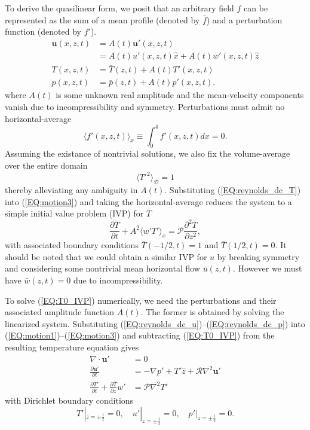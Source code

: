 \documentclass[reprint,amsmath,amssymb,aps]{revtex4-1}
\begin{document}
To derive the quasilinear form, we posit that an arbitrary field $f$ can be represented as the sum of a mean profile (denoted by $\bar{f}$) and a perturbation function (denoted by $f'$).
\begin{align}
    \mathbf{u}(x, z, t) &= A(t) \mathbf{u'}(x, z, t) \label{EQ:reynolds_dc_u}\\
    &= A(t) u'(x, z, t)\hat{x} + A(t) w'(x, z, t)\hat{z} \\
    T(x, z, t) &= \bar{T}(z, t) + A(t) T'(x, z, t) \label{EQ:reynolds_dc_T}\\
    p(x, z, t) &= \bar{p}(z, t) + A(t) p'(x, z, t) \label{EQ:reynolds_dc_p}.
\end{align}
where $A(t)$ is some unknown real amplitude and the mean-velocity components vanish due to incompressibility and symmetry. Perturbations must admit no horizontal-average
\begin{equation}
    \langle f'(x, z, t) \rangle_x \equiv \int_{0}^4 f'(x, z, t) dx = 0.
\end{equation}
Assuming the existance of nontrivial solutions, we also fix the volume-average over the entire domain
\begin{equation}
  \langle T'^2 \rangle_{\mathcal{D}} = 1
\end{equation}
thereby alleviating any ambiguity in $A(t)$. 
Substituting (\ref{EQ:reynolds_dc_T}) into (\ref{EQ:motion3}) and taking the horizontal-average reduces the system to a simple initial value problem (IVP) for $\bar{T}$
\begin{equation}
  \frac{\partial \bar{T}}{\partial t} + A^2 \langle w'T' \rangle_x = \mathcal{P}  \frac{\partial^2 \bar{T}}{\partial z^2}, \label{EQ:T0_IVP}
\end{equation}
with associated boundary conditions $\bar{T}(-1/2, t) = 1$ and $\bar{T}(1/2, t) = 0$. It should be noted that we could obtain a similar IVP for $u$ by breaking symmetry and considering some nontrivial mean horizontal flow $\bar{u}(z, t)$. However we must have $\bar{w}(z, t) = 0$ due to incompressibility.

To solve (\ref{EQ:T0_IVP}) numerically, we need the perturbations and their associated amplitude function $A(t)$. 
The former is obtained by solving the linearized system. Substituting (\ref{EQ:reynolds_dc_u})--(\ref{EQ:reynolds_dc_p}) into (\ref{EQ:motion1})--(\ref{EQ:motion3}) and subtracting (\ref{EQ:T0_IVP}) from the resulting temperature equation gives
\begin{align}
    \nabla \cdot \mathbf{u'} &= 0 \label{EQ:linear1}\\
    \frac{\partial\mathbf{u'}}{\partial t} &= - \nabla p' + T'\hat{z} + \mathcal{R} \nabla^2 \mathbf{u'} \label{EQ:linear2}\\
    \frac{\partial T'}{\partial t} + \frac{\partial \bar{T}}{\partial z} w' &= \mathcal{P} \nabla^2 T' \label{EQ:linear3}
\end{align}
with Dirichlet boundary conditions 
\begin{equation}
    T'|_{z = \pm \frac{1}{2}} = 0, \quad u'|_{z = \pm \frac{1}{2}} = 0, \quad p'|_{z = \pm \frac{1}{2}} = 0.
\end{equation}
\end{document}
